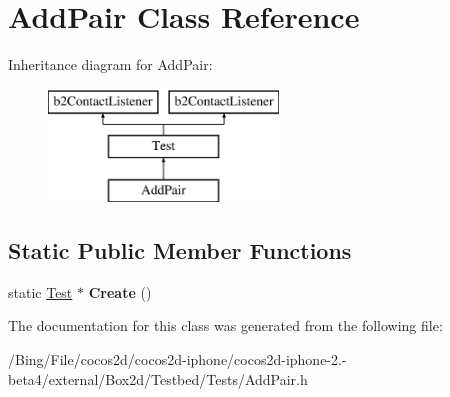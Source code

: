 \hypertarget{class_add_pair}{\section{Add\-Pair Class Reference}
\label{class_add_pair}
}
Inheritance diagram for Add\-Pair\-:\begin{figure}[H]
\begin{center}
\leavevmode
\includegraphics[height=3.000000cm]{class_add_pair}
\end{center}
\end{figure}
\subsection*{Static Public Member Functions}
\begin{DoxyCompactItemize}
\item 
\hypertarget{class_add_pair_a171aa918e501aad956b78beda16a9cfe}{static \hyperlink{class_test}{Test} $\ast$ {\bfseries Create} ()}\label{class_add_pair_a171aa918e501aad956b78beda16a9cfe}

\end{DoxyCompactItemize}


The documentation for this class was generated from the following file\-:\begin{DoxyCompactItemize}
\item 
/\-Bing/\-File/cocos2d/cocos2d-\/iphone/cocos2d-\/iphone-\/2.-\/beta4/external/\-Box2d/\-Testbed/\-Tests/Add\-Pair.\-h\end{DoxyCompactItemize}

